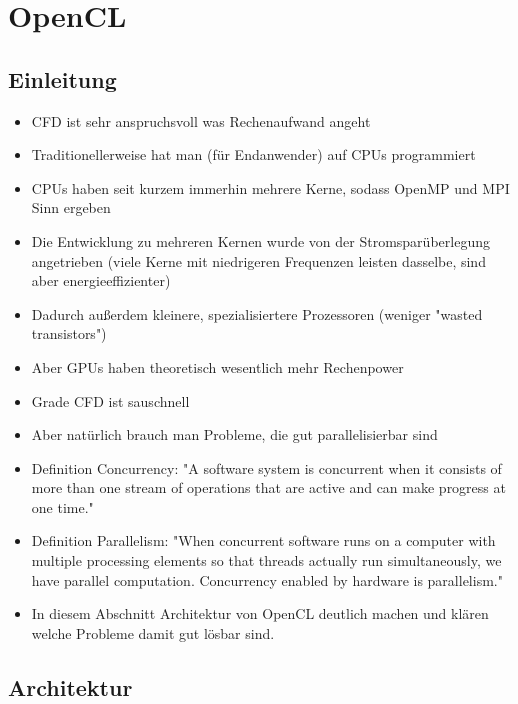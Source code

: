 \section{OpenCL}

\subsection{Einleitung}

\begin{itemize}
\item CFD ist sehr anspruchsvoll was Rechenaufwand angeht
\item Traditionellerweise hat man (für Endanwender) auf CPUs programmiert
\item CPUs haben seit kurzem immerhin mehrere Kerne, sodass OpenMP und MPI Sinn ergeben
\item Die Entwicklung zu mehreren Kernen wurde von der Stromsparüberlegung angetrieben (viele Kerne mit niedrigeren Frequenzen leisten dasselbe, sind aber energieeffizienter)
\item Dadurch außerdem kleinere, spezialisiertere Prozessoren (weniger "wasted transistors")
\item Aber GPUs haben theoretisch wesentlich mehr Rechenpower\cite{Guide2012}
\item Grade CFD ist sauschnell
\item Aber natürlich brauch man Probleme, die gut parallelisierbar sind
\item Definition Concurrency: "A software system is concurrent when it consists of more than one stream of operations that are active and can make progress at one time."
\item Definition Parallelism: "When concurrent software runs on a computer with multiple processing elements so that threads actually run simultaneously, we have parallel computation. Concurrency enabled by hardware is parallelism."
\item In diesem Abschnitt Architektur von OpenCL deutlich machen und klären welche Probleme damit gut lösbar sind.
\end{itemize}

\subsection{Architektur}

